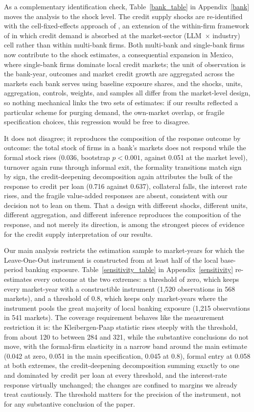\documentclass[12pt]{article}
\begin{document}
As a complementary identification check, Table~\ref{bank_table} in Appendix~\ref{bank} moves the analysis to the shock level. The credit supply shocks are re-identified with the cell-fixed-effects approach of \citet{degryse2019identifying}, an extension of the within-firm framework of \citet{khwaja2008tracing} in which credit demand is absorbed at the market-sector (LLM~$\times$ industry) cell rather than within multi-bank firms. Both multi-bank and single-bank firms now contribute to the shock estimates, a consequential expansion in Mexico, where single-bank firms dominate local credit markets; the unit of observation is the bank-year, outcomes and market credit growth are aggregated across the markets each bank serves using baseline exposure shares, and the shocks, units, aggregation, controls, weights, and samples all differ from the market-level design, so nothing mechanical links the two sets of estimates: if our results reflected a particular scheme for purging demand, the own-market overlap, or fragile specification choices, this regression would be free to disagree.

It does not disagree; it reproduces the composition of the response outcome by outcome: the total stock of firms in a bank's markets does not respond while the formal stock rises (0.036, bootstrap $p < 0.001$, against 0.051 at the market level), turnover again runs through informal exit, the formality transitions match sign by sign, the credit-deepening decomposition again attributes the bulk of the response to credit per loan (0.716 against 0.637), collateral falls, the interest rate rises, and the fragile value-added responses are absent, consistent with our decision not to lean on them. That a design with different shocks, different units, different aggregation, and different inference reproduces the composition of the response, and not merely its direction, is among the strongest pieces of evidence for the credit supply interpretation of our results.

Our main analysis restricts the estimation sample to market-years for which the Leave-One-Out instrument is constructed from at least half of the local base-period banking exposure. Table~\ref{sensitivity_table} in Appendix~\ref{sensitivity} re-estimates every outcome at the two extremes: a threshold of zero, which keeps every market-year with a constructible instrument (1,520 observations in 568 markets), and a threshold of $0.8$, which keeps only market-years where the instrument pools the great majority of local banking exposure (1,215 observations in 541 markets). The coverage requirement behaves like the measurement restriction it is: the Kleibergen-Paap statistic rises steeply with the threshold, from about 120 to between 284 and 321, while the substantive conclusions do not move, with the formal-firm elasticity in a narrow band around the main estimate (0.042 at zero, 0.051 in the main specification, 0.045 at 0.8), formal entry at 0.058 at both extremes, the credit-deepening decomposition summing exactly to one and dominated by credit per loan at every threshold, and the interest-rate response virtually unchanged; the changes are confined to margins we already treat cautiously. The threshold matters for the precision of the instrument, not for any substantive conclusion of the paper.
\end{document}
